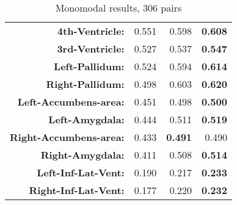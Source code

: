 \begin{table}[htbp]
{\begin{tabular}{rrrr}
    \textbf{4th-Ventricle:} & 0.551 & 0.598 & \textbf{0.608} \\
    \textbf{3rd-Ventricle:} & 0.527 & 0.537 & \textbf{0.547} \\
    \textbf{Left-Pallidum:} & 0.524 & 0.594 & \textbf{0.614} \\
    \textbf{Right-Pallidum:} & 0.498 & 0.603 & \textbf{0.620} \\
    \textbf{Left-Accumbens-area:} & 0.451 & 0.498 & \textbf{0.500} \\
    \textbf{Left-Amygdala:} & 0.444 & 0.511 & \textbf{0.519} \\
    \textbf{Right-Accumbens-area:} & 0.433 & \textbf{0.491} & 0.490 \\
    \textbf{Right-Amygdala:} & 0.411 & 0.508 & \textbf{0.514} \\
    \textbf{Left-Inf-Lat-Vent:} & 0.190 & 0.217 & \textbf{0.233} \\
    \textbf{Right-Inf-Lat-Vent:} & 0.177 & 0.220 & \textbf{0.232} \\
    \bottomrule
    \end{tabular}}%
    \caption{Monomodal results, 306 pairs}
  \label{tab:addlabel}%
\end{table}%
